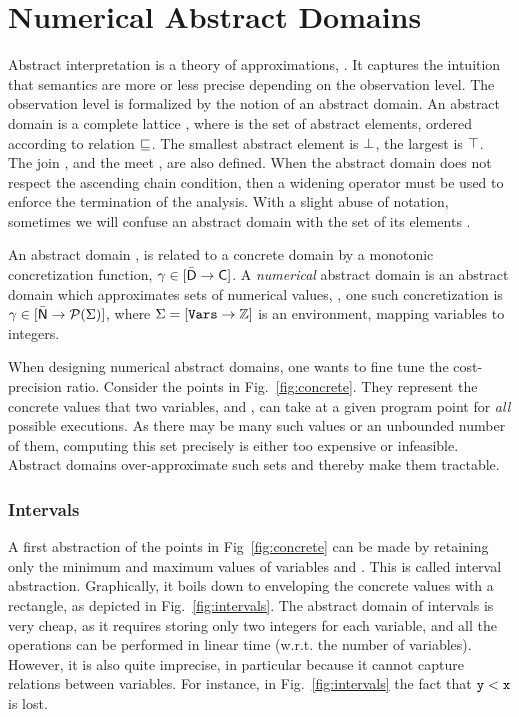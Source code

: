 \documentclass{sig-alternate}
\begin{document}
\section{Numerical Abstract Domains}
Abstract interpretation is a theory of approximations, \cite{CousotCousot77}.
It captures the intuition that semantics are more or less precise depending on the observation level.
The observation level is formalized by the notion of an abstract domain.
An abstract domain  is a complete lattice , where  is the set of abstract elements, ordered according to relation ${\sqsubseteq}$. 
The smallest abstract element is ${\bot}$, the largest is ${\top}$. 
The join \acup, and the meet \acap,  are also defined.
When the abstract domain  does not respect the ascending chain condition, then a widening operator \awidening{} must be used to enforce the termination of the analysis.
With a slight abuse of notation, sometimes we will confuse an  abstract domain  with the set of its elements .

An abstract domain , is related to a concrete domain  by a monotonic concretization function, $\gamma \in [\bar{\mathsf{D}} \rightarrow\mathsf{C}]$.
A \emph{numerical} abstract domain  is an abstract domain
which approximates sets of numerical values, \eg, one such
concretization is  $\gamma \in [\bar{\mathsf{N}} \rightarrow\mathcal{P}{(\Sigma)}]$, where
$\Sigma = [\mathtt{Vars} \rightarrow\mathbb{Z}]$ is an environment,
mapping variables to integers.

When designing numerical abstract domains, one wants to fine tune the
cost-precision ratio.  Consider the points in Fig.~\ref{fig:concrete}.
They represent the concrete values that two variables,  and ,
can take at a given program point for \emph{all} possible
executions.  As there may be many such values or an unbounded number
of them, computing this set precisely is either too expensive or
infeasible. Abstract domains over-approximate such sets and thereby
make them tractable.

\subsubsection*{Intervals} 
A first abstraction of the points in Fig~\ref{fig:concrete} can be
made by retaining only the minimum and maximum values of variables  and .
This is called interval abstraction. Graphically, it boils down to enveloping the concrete values with a rectangle, as depicted in Fig.~\ref{fig:intervals}.
The abstract domain of intervals is very cheap, as it requires
storing only two integers for each variable, and all the operations can be performed in linear time (w.r.t. the number of variables).
However, it is also quite imprecise, in particular because it cannot capture relations between variables.
For instance, in Fig.~\ref{fig:intervals} the fact that $\mathtt{y} < \mathtt{x}$ is lost.
 
\end{document}
